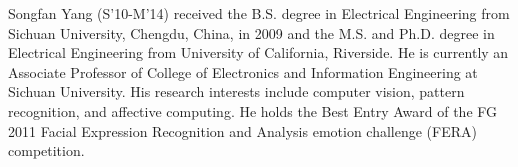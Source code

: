 \documentclass[10pt,journal]{IEEEtran}
\begin{document}
%

\ifCLASSOPTIONcaptionsoff
  \newpage
\fi





%
%
%




\begin{IEEEbiography}{Songfan Yang}
(S'10-M'14) received the B.S. degree in Electrical Engineering from Sichuan University, Chengdu, China, in 2009 and the M.S. and Ph.D. degree in Electrical Engineering from University of California, Riverside. He is currently an Associate Professor of College of Electronics and Information Engineering at Sichuan University. His research interests include computer vision, pattern recognition, and affective computing. He holds the Best Entry Award of the FG 2011 Facial Expression Recognition and Analysis emotion challenge (FERA) competition.
\end{IEEEbiography}
\end{document}
